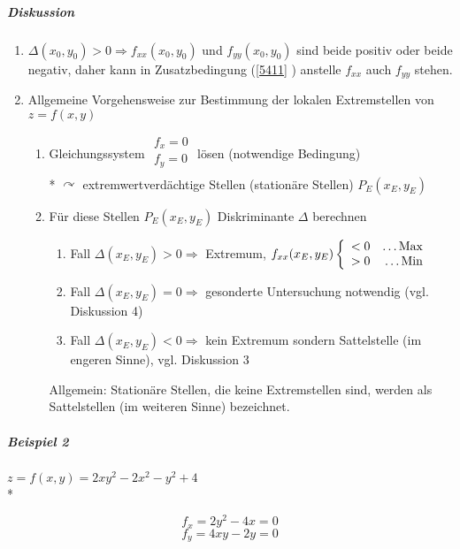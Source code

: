 \documentclass[a4paper]{scrartcl}
\begin{document}
\subparagraph{Diskussion}
\begin{enumerate}
\item $\Delta (x_0,y_0) > 0 \Rightarrow f_{xx} (x_0,y_0)$ und $f_{yy} (x_0,y_0)$ sind beide positiv oder beide negativ, daher kann in Zusatzbedingung (\ref{5411} ) anstelle $f_{xx}$ auch $f_{yy}$ stehen.
\item Allgemeine Vorgehensweise zur Bestimmung der lokalen Extremstellen von $z=f(x,y)$
\begin{enumerate}
\item Gleichungssystem $\begin{array}{c} f_x=0 \\ f_y = 0\\ \end{array}$ lösen (notwendige Bedingung)\\*
$\curvearrowright$ extremwertverdächtige Stellen (stationäre Stellen) $P_E(x_E,y_E)$
\item Für diese Stellen $P_E(x_E,y_E)$ Diskriminante $\Delta$ berechnen
\begin{enumerate}
\item Fall $\Delta (x_E,y_E) > 0 \Rightarrow$ Extremum, $f_{xx} (x_E,y_E) \left \{ \begin{array}{lr} <0 & \text{\dots Max} \\ > 0 & \text{\dots Min} \\ \end{array} \right.$
\item Fall $\Delta (x_E,y_E) = 0 \Rightarrow$ gesonderte Untersuchung notwendig  (vgl. Diskussion 4)
\item Fall $\Delta (x_E,y_E) <0 \Rightarrow$ kein Extremum sondern Sattelstelle (im engeren Sinne), vgl. Diskussion 3
\end{enumerate}
Allgemein: Stationäre Stellen, die keine Extremstellen sind, werden als Sattelstellen (im weiteren Sinne) bezeichnet.
\end{enumerate}
\end{enumerate}

\subparagraph{Beispiel 2} $z=f(x,y) = 2xy^2 - 2x^2 - y^2 +4$\\*

\[ f_x = 2y^2 - 4x = 0 \]
\[ f_y = 4xy - 2y = 0\]
\end{document}

